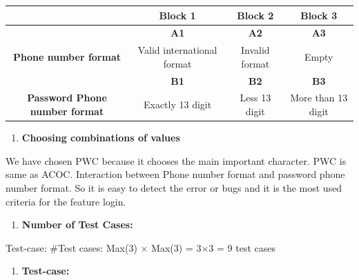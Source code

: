 \begin{table}[h!]
    \centering
    \begin{tabular}{|c|c|c|c|}
    \hline
    \textbf{} & \textbf{Block 1} & \textbf{Block 2} & \textbf{Block 3} \\
    \hline
    \textbf{} & \textbf{A1} & \textbf{A2} & \textbf{A3} \\
    \hline
    \textbf{Phone number format} & Valid international format & Invalid format & Empty \\
    \hline
    \textbf{} & \textbf{B1} & \textbf{B2} & \textbf{B3} \\
    \hline
    \textbf{Password Phone number format} & Exactly 13 digit & Less 13 digit & More than 13 digit \\
    \hline
    \end{tabular}
\end{table}


\begin{enumerate}[resume]
    \item \textbf{Choosing combinations of values}
\end{enumerate}

\noindent
We have chosen PWC because it chooses the main important character. PWC is same as ACOC. Interaction between Phone number format and password phone number format. So it is easy to detect the error or bugs and it is the most used criteria for the feature login.

\begin{enumerate}[resume]
    \item \textbf{Number of Test Cases:}
\end{enumerate}

\noindent
Test-case: \#Test cases: Max(3) $\times$ Max(3) = 3$\times$3 = 9 test cases

\begin{enumerate}[resume]
    \item \textbf{Test-case:}
\end{enumerate}

